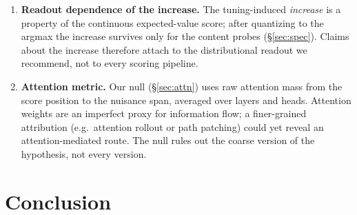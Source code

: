 \documentclass[11pt]{article}
\begin{document}
\begin{enumerate}
        length bias only in that one case; the padded-vs-control contrast alone, which is
        quality-preserving, shows the same direction (mean $|\Delta|$
        $0.29\!\to\!0.53$ after tuning, 11/13 families). Empirically the concern is
        immaterial: a variant-level decomposition attributes $99\%$ of the measured
        verbosity bias to the padded variant and $1\%$ to the terse one.
  \item \textbf{Readout dependence of the increase.} The tuning-induced \emph{increase}
        is a property of the continuous expected-value score; after quantizing to the
        argmax the increase survives only for the content probes
        (\S\ref{sec:spec}). Claims about the increase therefore attach to the
        distributional readout we recommend, not to every scoring pipeline.
  \item \textbf{Attention metric.} Our null (\S\ref{sec:attn}) uses raw attention mass
        from the score position to the nuisance span, averaged over layers and heads.
        Attention weights are an imperfect proxy for information flow; a finer-grained
        attribution (e.g.\ attention rollout or path patching) could yet reveal an
        attention-mediated route. The null rules out the coarse version of the
        hypothesis, not every version.
\end{enumerate}

\section{Conclusion}
\CONCLUSION{}
\end{document}
